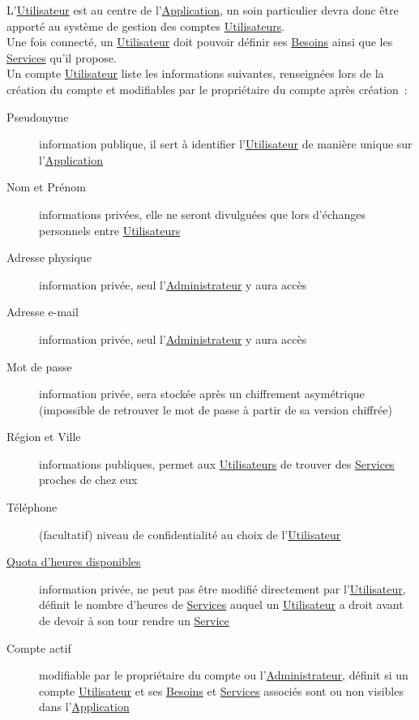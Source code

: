 \documentclass[french]{article}
\begin{document}
			L’\hyperlink{utilisateur}{Utilisateur} est au centre de
			 l’\hyperlink{application}{Application}, un soin particulier devra donc
			 être apporté au système de gestion des comptes
			 \hyperlink{utilisateur}{Utilisateurs}.\\
			Une fois connecté, un \hyperlink{utilisateur}{Utilisateur} doit pouvoir
			 définir ses \hyperlink{besoin}{Besoins} ainsi que les
			 \hyperlink{service}{Services} qu’il propose.\\
			
			Un compte \hyperlink{utilisateur}{Utilisateur} liste les informations
			 suivantes, renseignées lors de la création du compte et modifiables par
			 le propriétaire du compte après création :
			\begin{description}
				\item [Pseudonyme]
					information publique, il sert à identifier
					 l’\hyperlink{utilisateur}{Utilisateur} de manière unique sur
					 l’\hyperlink{application}{Application}
				\item [Nom et Prénom]
					informations privées, elle ne seront divulguées que lors d’échanges
					 personnels entre \hyperlink{utilisateur}{Utilisateurs}
				\item [Adresse physique]
					information privée, seul l’\hyperlink{administrateur}{Administrateur}
					 y aura accès
				\item [Adresse e-mail]
					information privée, seul l’\hyperlink{administrateur}{Administrateur}
					 y aura accès
				\item [Mot de passe]
					information privée, sera stockée après un chiffrement asymétrique
					 (impossible de retrouver le mot de passe à partir de sa version
					 chiffrée)
				\item [Région et Ville]
					informations publiques, permet aux
					 \hyperlink{utilisateur}{Utilisateurs} de trouver des
					 \hyperlink{service}{Services} proches de chez eux
				\item [Téléphone]
					(facultatif) niveau de confidentialité au choix de
					 l’\hyperlink{utilisateur}{Utilisateur}
				\item [\hyperlink{quota}{Quota d’heures disponibles}]
					information privée, ne peut pas être modifié directement par
					 l’\hyperlink{utilisateur}{Utilisateur}, définit le nombre d’heures de
					 \hyperlink{service}{Services} auquel un
					 \hyperlink{utilisateur}{Utilisateur} a droit avant de devoir à son
					 tour rendre un \hyperlink{service}{Service}
				\item [Compte actif]
					modifiable par le propriétaire du compte ou
					 l’\hyperlink{administrateur}{Administrateur}, définit si un compte
					 \hyperlink{utilisateur}{Utilisateur} et ses
					 \hyperlink{besoin}{Besoins} et \hyperlink{service}{Services} associés
					 sont ou non visibles dans l’\hyperlink{application}{Application}
			\end{description}
			
\end{document}
